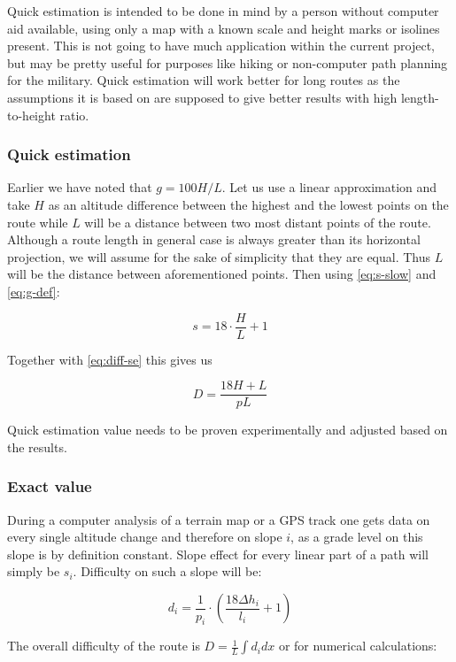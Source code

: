 \documentclass[12pt]{article}
\begin{document}
Quick estimation is intended to be done in mind by a person without computer aid available, using only a map with a known scale and height marks or isolines present. This is not going to have much application within the current project, but may be pretty useful for purposes like hiking or non-computer  path planning for the military. Quick estimation will work better for long routes as the assumptions it is based on are supposed to give better results with high length-to-height ratio.


\subsubsection{Quick estimation}
Earlier we have noted that $g = 100 H / L$. Let us use a linear approximation and take $H$ as an altitude difference between the highest and the lowest points on the route while $L$ will be a distance between two most distant points of the route. Although a route length in general case is always greater than its horizontal projection, we will assume for the sake of simplicity that they are equal. Thus $L$ will be the distance between aforementioned points. Then using \ref{eq:s-slow} and \ref{eq:g-def}:

\begin{equation*}
s = 18\cdot\frac{H}{L} + 1
\end{equation*}

Together with \ref{eq:diff-se} this gives us

\begin{equation*}
D = \frac{18 H + L}{pL}
\end{equation*}

Quick estimation value needs to be proven experimentally and adjusted based on the results.


\subsubsection{Exact value}
During a computer analysis of a terrain map or a GPS track one gets data on every single altitude change and therefore on slope $i$, as a grade level on this slope is by definition constant. Slope effect for every linear part of a path will simply be $s_{i}$. Difficulty on such a slope will be:

\begin{equation}
d_{i} = \frac{1}{p_{i}} \cdot (\frac{18 \Delta h_{i}}{l_{i}} + 1)
\end{equation}

The overall difficulty of the route is $D = \frac{1}{L} \int d_{i} dx$ or for numerical calculations:
\end{document}
